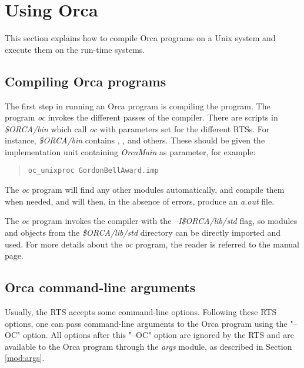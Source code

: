 \documentclass[10pt]{article}
\begin{document}
\section{Using Orca}\label{sec:using}

This section explains how to compile Orca programs on a Unix system and execute
them on the run-time systems.

\subsection{Compiling Orca programs}

The first step in running an Orca program is compiling the program.
The program
{\em oc}
invokes the different passes of the compiler.
There are scripts
in
{\em \$ORCA/bin}
which call 
{\em oc}
with parameters set for the different RTSs.
For instance,
{\em \$ORCA/bin}
contains
{}
{},
{}
{},
and others.
These should be given the implementation unit containing
{\em OrcaMain}
as parameter, for example:
\begin{quote}
\begin{verbatim}
oc_unixproc GordonBellAward.imp
\end{verbatim}
\end{quote}
The
{\em oc}
program will find any other modules automatically, and compile them
when needed, and will then, in the absence of errors,
produce an
{\em a.out}
file.

The
{\em oc}
program invokes the compiler with the
{\em --I\$ORCA/lib/std}
flag,
so modules and objects from the
{\em \$ORCA/lib/std}
directory can be directly
imported and used.
For more details about the
{\em oc}
program, the reader is referred to the
{}
{}
manual page.

\subsection{Orca command-line arguments}

Usually, the RTS accepts some command-line options. 
Following these RTS options, one 
can pass command-line arguments to the Orca program using the "--OC"
option.
All options after this "--OC" option are ignored by the RTS and are
available to the Orca program through the {\em args} module, as described
in Section \ref{mod:args}.
\end{document}
